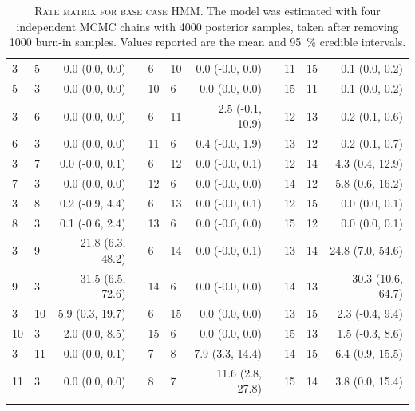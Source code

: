 \begin{xltabular}{\textwidth}{llrp{0.2cm}llrp{0.2cm}llr}
    3 & 5 & 0.0 (0.0, 0.0) & & 6 & 10 & 0.0 (-0.0, 0.0) & & 11 & 15 & 0.1 (0.0, 0.2) \\
    5 & 3 & 0.0 (0.0, 0.0) & & 10 & 6 & 0.0 (0.0, 0.0) & & 15 & 11 & 0.1 (0.0, 0.2) \\
    3 & 6 & 0.0 (0.0, 0.0) & & 6 & 11 & 2.5 (-0.1, 10.9) & & 12 & 13 & 0.2 (0.1, 0.6) \\
    6 & 3 & 0.0 (0.0, 0.0) & & 11 & 6 & 0.4 (-0.0, 1.9) & & 13 & 12 & 0.2 (0.1, 0.7) \\
    3 & 7 & 0.0 (-0.0, 0.1) & & 6 & 12 & 0.0 (-0.0, 0.1) & & 12 & 14 & 4.3 (0.4, 12.9) \\
    7 & 3 & 0.0 (0.0, 0.0) & & 12 & 6 & 0.0 (-0.0, 0.0) & & 14 & 12 & 5.8 (0.6, 16.2) \\
    3 & 8 & 0.2 (-0.9, 4.4) & & 6 & 13 & 0.0 (-0.0, 0.1) & & 12 & 15 & 0.0 (0.0, 0.1) \\
    8 & 3 & 0.1 (-0.6, 2.4) & & 13 & 6 & 0.0 (-0.0, 0.0) & & 15 & 12 & 0.0 (0.0, 0.1) \\
    3 & 9 & 21.8 (6.3, 48.2) & & 6 & 14 & 0.0 (-0.0, 0.1) & & 13 & 14 & 24.8 (7.0, 54.6) \\
    9 & 3 & 31.5 (6.5, 72.6) & & 14 & 6 & 0.0 (-0.0, 0.0) & & 14 & 13 & 30.3 (10.6, 64.7) \\
    3 & 10 & 5.9 (0.3, 19.7) & & 6 & 15 & 0.0 (0.0, 0.0) & & 13 & 15 & 2.3 (-0.4, 9.4) \\
    10 & 3 & 2.0 (0.0, 8.5) & & 15 & 6 & 0.0 (0.0, 0.0) & & 15 & 13 & 1.5 (-0.3, 8.6) \\
    3 & 11 & 0.0 (0.0, 0.1) & & 7 & 8 & 7.9 (3.3, 14.4) & & 14 & 15 & 6.4 (0.9, 15.5) \\
    11 & 3 & 0.0 (0.0, 0.0) & & 8 & 7 & 11.6 (2.8, 27.8) & & 15 & 14 & 3.8 (0.0, 15.4) \\
    \bottomrule
    \caption[Rate matrix for base case HMM]{\textsc{Rate matrix for base case HMM}. The model was estimated with four independent MCMC chains with \num{4000} posterior samples, taken after removing \num{1000} burn-in samples. Values reported are the mean and \SI{95}{\percent} credible intervals.}\label{tab:base_case_rate_matrix} 
\end{xltabular}

